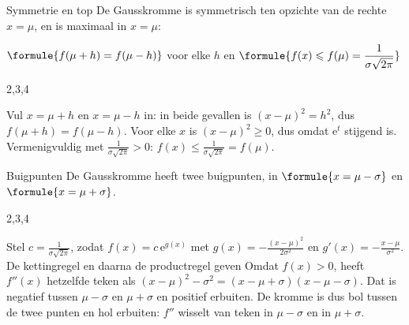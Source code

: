 \begin{theorie}
\begin{stelling}{Symmetrie en top}
De Gausskromme is symmetrisch ten opzichte van de rechte $x = \mu$, en is maximaal in $x = \mu$:

\vspace{1mm}
\qquad $\formule{f(\mu + h) = f(\mu - h)}$ \quad voor elke $h$ \qquad en \qquad $\formule{f(x) \leqslant f(\mu) = \dfrac{1}{\sigma\sqrt{2\pi}}}$
\end{stelling}
\begin{alleenvoor}{2,3,4}

\begin{bewijs}
Vul $x = \mu + h$ en $x = \mu - h$ in: in beide gevallen is $(x - \mu)^2 = h^2$, dus $f(\mu + h) = f(\mu - h)$. Voor elke $x$ is $(x - \mu)^2 \geqslant 0$, dus
omdat $\mathrm{e}^t$ stijgend is. Vermenigvuldig met $\frac{1}{\sigma\sqrt{2\pi}} > 0$: $f(x) \leqslant \frac{1}{\sigma\sqrt{2\pi}} = f(\mu)$.
\end{bewijs}
\end{alleenvoor}

\begin{stelling}{Buigpunten}
De Gausskromme heeft twee buigpunten, in $\formule{x = \mu - \sigma}$ en $\formule{x = \mu + \sigma}$.
\end{stelling}
\begin{alleenvoor}{2,3,4}

\begin{bewijs}
Stel $c = \frac{1}{\sigma\sqrt{2\pi}}$, zodat $f(x) = c\,\mathrm{e}^{g(x)}$ met $g(x) = -\frac{(x - \mu)^2}{2\sigma^2}$ en $g'(x) = -\frac{x - \mu}{\sigma^2}$. De kettingregel en daarna de productregel geven
Omdat $f(x) > 0$, heeft $f''(x)$ hetzelfde teken als $(x - \mu)^2 - \sigma^2 = (x - \mu + \sigma)(x - \mu - \sigma)$. Dat is negatief tussen $\mu - \sigma$ en $\mu + \sigma$ en positief erbuiten. De kromme is dus bol tussen de twee punten en hol erbuiten: $f''$ wisselt van teken in $\mu - \sigma$ en in $\mu + \sigma$.
\end{bewijs}
\end{alleenvoor}
\end{theorie}


